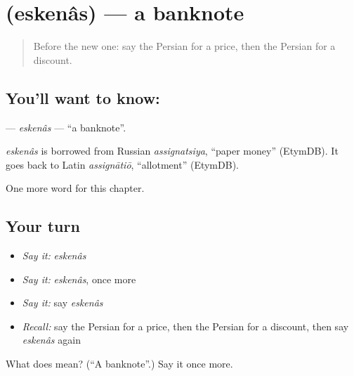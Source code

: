 \section[\texorpdfstring{\fa{اسکناس} (eskenâs)}{اسکناس (eskenâs)}]{ (eskenâs) — a banknote}

\label{lesson:FA-C274-eskenas}



\begin{quote}
Before the new one: say the Persian for a price, then the Persian for a discount.
\end{quote}

\subsection*{You'll want to know: }
\textbf{} — \emph{eskenâs} — \textquotedblleft{}a banknote\textquotedblright{}.

\begin{cousinweb}
\emph{eskenâs} is borrowed from Russian \emph{assignatsiya}, \textquotedblleft{}paper money\textquotedblright{} (EtymDB). It goes back to Latin \emph{assignātiō}, \textquotedblleft{}allotment\textquotedblright{} (EtymDB).
\end{cousinweb}

\begin{grammarlens}[title={What you've built}]
One more word for this chapter.
\end{grammarlens}

\subsection*{Your turn}
\begin{itemize}
\raggedright
  \item \emph{Say it:} \emph{eskenâs}
  \item \emph{Say it:} \emph{eskenâs}, once more
  \item \emph{Say it:} say \emph{eskenâs}
  \item \emph{Recall:} say the Persian for a price, then the Persian for a discount, then say \emph{eskenâs} again
\end{itemize}

\begin{tcolorbox}[breakable,colback=teal!4,colframe=teal!35!black,title={Before you move on}]
What does  mean? (\textquotedblleft{}A banknote\textquotedblright{}.) Say it once more.
\end{tcolorbox}
